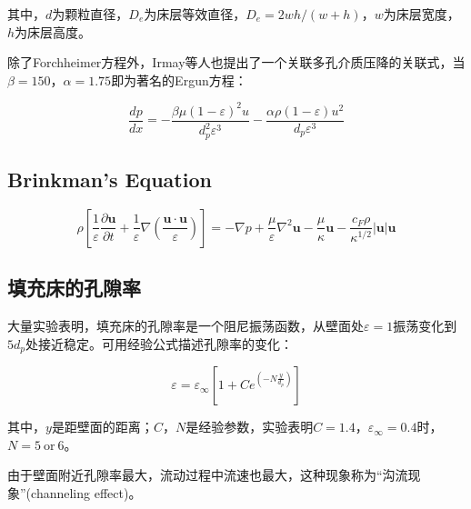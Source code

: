 其中，$ d $为颗粒直径，$ D_e $为床层等效直径，$ D_e=2wh/(w+h) $，$ w $为床层宽度，$ h $为床层高度。

除了Forchheimer方程外，Irmay等人也提出了一个关联多孔介质压降的关联式，当$ \beta=150 $，$ \alpha=1.75 $即为著名的Ergun方程：

\begin{equation}\label{Irmay}
\frac{dp}{dx}=-\frac{\beta\mu(1-\varepsilon)^2 u}{d_p^2\varepsilon^3}-\frac{\alpha\rho(1-\varepsilon)u^2}{d_p\varepsilon^3}
\end{equation}

\subsection{Brinkman's Equation}

\begin{equation}\label{Brinkman}
\rho\left[ \frac{1}{\varepsilon}\frac{\partial \bm{u}}{\partial t} + \frac{1}{\varepsilon}\nabla\left( \frac{\bm{u\cdot u}}{\varepsilon} \right) \right] = -\nabla p + \frac{\mu}{\varepsilon}\nabla^2\bm{u}-\frac{\mu}{\kappa}\bm{u}-\frac{c_F\rho}{\kappa^{1/2}}|\bm{u}|\bm{u}
\end{equation}

\subsection{填充床的孔隙率}
大量实验表明，填充床的孔隙率是一个阻尼振荡函数，从壁面处$ \varepsilon=1 $振荡变化到$ 5d_p $处接近稳定。可用经验公式描述孔隙率的变化：

\begin{equation}
\varepsilon=\varepsilon_{\infty}\left[ 1+C e^{\left(-N\frac{y}{d_p}\right)} \right]
\end{equation}

其中，$ y $是距壁面的距离；$ C $，$ N $是经验参数，实验表明$ C=1.4 $，$ \varepsilon_{\infty}=0.4 $时，$ N=5\ \text{or}\ 6 $。

由于壁面附近孔隙率最大，流动过程中流速也最大，这种现象称为“沟流现象”(channeling effect)。








